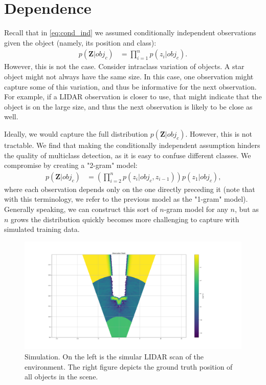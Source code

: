 \section{Dependence}

Recall that in \eqref{eq:cond_ind} we assumed conditionally independent observations
given the object (namely, its position and class):
%
\begin{align}
  p( \mathbf{Z} | obj_c ) &= \prod_{i=1}^{n} { p( z_i | obj_c) }
  \text{.}
\end{align}
%
However, this is not the case. Consider intraclass variation of objects. A star
object might not always have the same size. In this case, one observation might
capture some of this variation, and thus be informative for the next
observation. For example, if a LIDAR observation is closer to use, that might
indicate that the object is on the large size, and thus the next observation is
likely to be close as well.

Ideally, we would capture the full distribution $p ( \mathbf{Z} | obj_c )$. However,
this is not tractable. We find that making the conditionally independent
assumption hinders the quality of multiclass detection, as it is easy to confuse
different classes. We compromise by creating a "2-gram" model:
%
\begin{align}
  p( \mathbf{Z} | obj_c ) &= \left( \prod_{i=2}^{n} { p( z_i | obj_c, z_{i-1}) }
  \right) p( z_1 | obj_c)
  \text{,}
\end{align}
%
where each observation depends only on the one directly preceding it (note that
with this terminology, we refer to the previous model as the "1-gram" model).
Generally speaking, we can construct this sort of $n$-gram model for any $n$,
but as $n$ grows the distribution quickly becomes more challenging to capture
with simulated training data.

\begin{figure}
  \centering
  \includegraphics[width=\textwidth]{figures/star_model.png}
  \caption{Simulation. On the left is the simular LIDAR scan of the environment.
    The right figure depicts the ground truth position of all objects in the
    scene.}
  \label{fig:star_model}
\end{figure}

